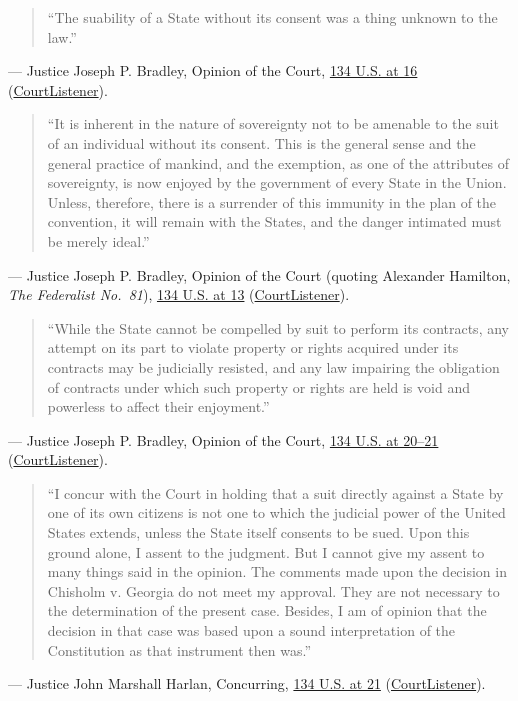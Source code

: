 \documentclass[12pt]{article}
\begin{document}
\begin{quote}
``The suability of a State without its consent was a thing unknown to the law.''
\end{quote}
\noindent --- Justice Joseph P. Bradley, Opinion of the Court, \href{https://supreme.justia.com/cases/federal/us/134/1/}{134 U.S. at 16} (\href{https://www.courtlistener.com/opinion/92702/hans-v-louisiana/}{CourtListener}).

\begin{quote}
``It is inherent in the nature of sovereignty not to be amenable to the suit of an individual without its consent. This is the general sense and the general practice of mankind, and the exemption, as one of the attributes of sovereignty, is now enjoyed by the government of every State in the Union. Unless, therefore, there is a surrender of this immunity in the plan of the convention, it will remain with the States, and the danger intimated must be merely ideal.''
\end{quote}
\noindent --- Justice Joseph P. Bradley, Opinion of the Court (quoting Alexander Hamilton, \textit{The Federalist No.\ 81}), \href{https://supreme.justia.com/cases/federal/us/134/1/}{134 U.S. at 13} (\href{https://www.courtlistener.com/opinion/92702/hans-v-louisiana/}{CourtListener}).

\begin{quote}
``While the State cannot be compelled by suit to perform its contracts, any attempt on its part to violate property or rights acquired under its contracts may be judicially resisted, and any law impairing the obligation of contracts under which such property or rights are held is void and powerless to affect their enjoyment.''
\end{quote}
\noindent --- Justice Joseph P. Bradley, Opinion of the Court, \href{https://supreme.justia.com/cases/federal/us/134/1/}{134 U.S. at 20--21} (\href{https://www.courtlistener.com/opinion/92702/hans-v-louisiana/}{CourtListener}).

\begin{quote}
``I concur with the Court in holding that a suit directly against a State by one of its own citizens is not one to which the judicial power of the United States extends, unless the State itself consents to be sued. Upon this ground alone, I assent to the judgment. But I cannot give my assent to many things said in the opinion. The comments made upon the decision in Chisholm v. Georgia do not meet my approval. They are not necessary to the determination of the present case. Besides, I am of opinion that the decision in that case was based upon a sound interpretation of the Constitution as that instrument then was.''
\end{quote}
\noindent --- Justice John Marshall Harlan, Concurring, \href{https://supreme.justia.com/cases/federal/us/134/1/}{134 U.S. at 21} (\href{https://www.courtlistener.com/opinion/92702/hans-v-louisiana/}{CourtListener}).
\end{document}
